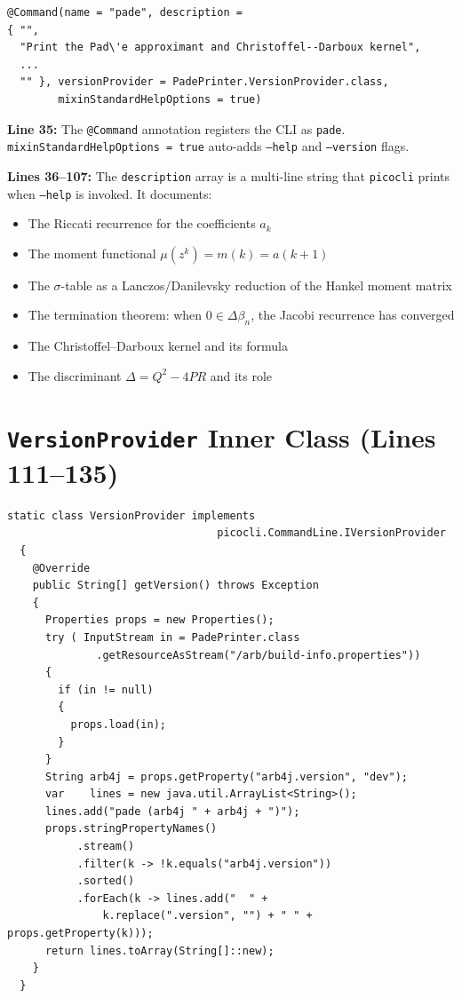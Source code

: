 \documentclass[a4paper,11pt]{article}
\begin{document}
\newpage

\begin{lstlisting}[firstnumber=35]
@Command(name = "pade", description =
{ "",
  "Print the Pad\'e approximant and Christoffel--Darboux kernel",
  ...
  "" }, versionProvider = PadePrinter.VersionProvider.class,
        mixinStandardHelpOptions = true)
\end{lstlisting}

\textbf{Line 35:} The \texttt{@Command} annotation registers the CLI as
\texttt{pade}. \texttt{mixinStandardHelpOptions = true} auto-adds
\texttt{--help} and \texttt{--version} flags.

\textbf{Lines 36--107:} The \texttt{description} array is a multi-line string
that \texttt{picocli} prints when \texttt{--help} is invoked. It documents:
\begin{itemize}[nosep]
\item The Riccati recurrence for the coefficients $a_k$
\item The moment functional $\mu(z^k) = m(k) = a(k+1)$
\item The $\sigma$-table as a Lanczos/Danilevsky reduction of the Hankel
  moment matrix
\item The termination theorem: when $0 \in \Delta\beta_n$, the Jacobi
  recurrence has converged
\item The Christoffel--Darboux kernel and its formula
\item The discriminant $\Delta = Q^2 - 4PR$ and its role
\end{itemize}

\section{\texttt{VersionProvider} Inner Class (Lines 111--135)}

\begin{lstlisting}[firstnumber=111]
static class VersionProvider implements
                                 picocli.CommandLine.IVersionProvider
  {
    @Override
    public String[] getVersion() throws Exception
    {
      Properties props = new Properties();
      try ( InputStream in = PadePrinter.class
              .getResourceAsStream("/arb/build-info.properties"))
      {
        if (in != null)
        {
          props.load(in);
        }
      }
      String arb4j = props.getProperty("arb4j.version", "dev");
      var    lines = new java.util.ArrayList<String>();
      lines.add("pade (arb4j " + arb4j + ")");
      props.stringPropertyNames()
           .stream()
           .filter(k -> !k.equals("arb4j.version"))
           .sorted()
           .forEach(k -> lines.add("  " +
               k.replace(".version", "") + " " + props.getProperty(k)));
      return lines.toArray(String[]::new);
    }
  }
\end{lstlisting}
\end{document}
